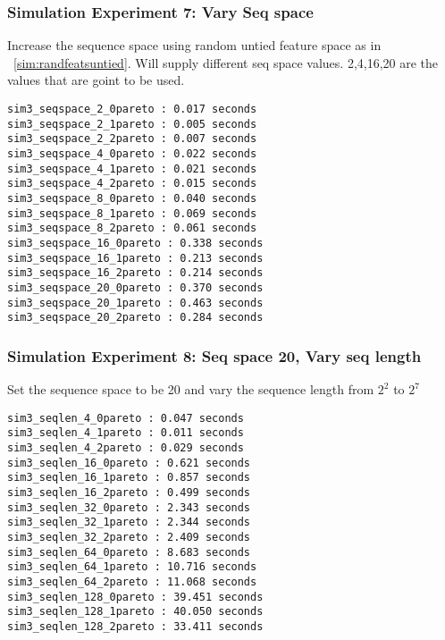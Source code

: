\subsubsection{Simulation Experiment 7: Vary Seq space }
\label{sim:seqspace}
Increase the sequence space using random untied feature space as in ~\ref{sim:randfeatsuntied}. Will supply different seq space values. 2,4,16,20 are the values that are goint to be used.
\begin{verbatim}
sim3_seqspace_2_0pareto : 0.017 seconds
sim3_seqspace_2_1pareto : 0.005 seconds
sim3_seqspace_2_2pareto : 0.007 seconds
sim3_seqspace_4_0pareto : 0.022 seconds
sim3_seqspace_4_1pareto : 0.021 seconds
sim3_seqspace_4_2pareto : 0.015 seconds
sim3_seqspace_8_0pareto : 0.040 seconds
sim3_seqspace_8_1pareto : 0.069 seconds
sim3_seqspace_8_2pareto : 0.061 seconds
sim3_seqspace_16_0pareto : 0.338 seconds
sim3_seqspace_16_1pareto : 0.213 seconds
sim3_seqspace_16_2pareto : 0.214 seconds
sim3_seqspace_20_0pareto : 0.370 seconds
sim3_seqspace_20_1pareto : 0.463 seconds
sim3_seqspace_20_2pareto : 0.284 seconds
\end{verbatim}


\subsubsection{Simulation Experiment 8: Seq space 20, Vary seq length}
\label{sim:seqlen}
Set the sequence space to be 20 and vary the sequence length from $2^2$  to $2^7$
\begin{verbatim}
sim3_seqlen_4_0pareto : 0.047 seconds
sim3_seqlen_4_1pareto : 0.011 seconds
sim3_seqlen_4_2pareto : 0.029 seconds
sim3_seqlen_16_0pareto : 0.621 seconds
sim3_seqlen_16_1pareto : 0.857 seconds
sim3_seqlen_16_2pareto : 0.499 seconds
sim3_seqlen_32_0pareto : 2.343 seconds
sim3_seqlen_32_1pareto : 2.344 seconds
sim3_seqlen_32_2pareto : 2.409 seconds
sim3_seqlen_64_0pareto : 8.683 seconds
sim3_seqlen_64_1pareto : 10.716 seconds
sim3_seqlen_64_2pareto : 11.068 seconds
sim3_seqlen_128_0pareto : 39.451 seconds
sim3_seqlen_128_1pareto : 40.050 seconds
sim3_seqlen_128_2pareto : 33.411 seconds
\end{verbatim}
%

